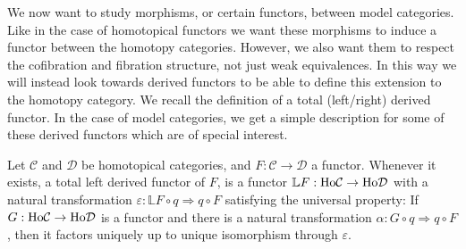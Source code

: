\documentclass[../thesis.tex]{subfiles}
\begin{document}
            We now want to study morphisms, or certain functors, between model categories. Like in the case of homotopical functors we want these morphisms to induce a functor between the homotopy categories. However, we also want them to respect the cofibration and fibration structure, not just weak equivalences. In this way we will instead look towards derived functors to be able to define this extension to the homotopy category. We recall the definition of a total (left/right) derived functor. In the case of model categories, we get a simple description for some of these derived functors which are of special interest.

            \begin{definition}
                Let $\mathcal{C}$ and $\mathcal{D}$ be homotopical categories, and $F:\mathcal{C}\rightarrow\mathcal{D}$ a functor. Whenever it exists, a total left derived functor of $F$, is a functor $\mathbb{L}F:\tt{Ho}\mathcal{C}\rightarrow \tt{Ho}\mathcal{D}$ with a natural transformation $\varepsilon :\mathbb{L}F\circ q \Rightarrow q\circ F$ satisfying the universal property: If $G:\tt{Ho}\mathcal{C}\rightarrow \tt{Ho}\mathcal{D}$ is a functor and there is a natural transformation $\alpha :G\circ q \Rightarrow q\circ F$, then it factors uniquely up to unique isomorphism through $\varepsilon$.
                \begin{center}
                    \qquad
                \end{center}


\end{definition}
\end{document}
